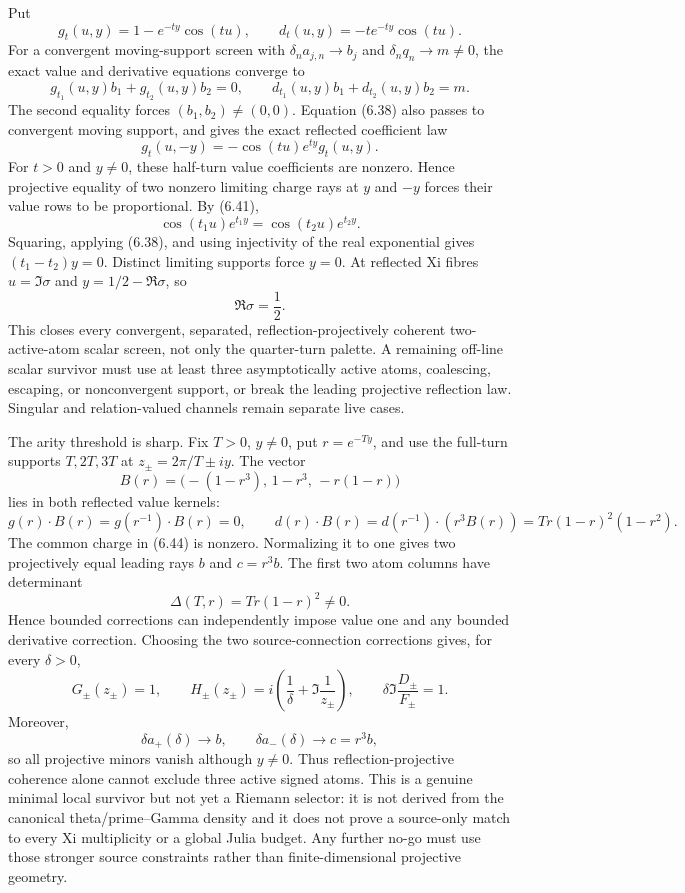 \documentclass[11pt]{article}
\theoremstyle{definition}
\theoremstyle{remark}
\begin{document}
Put
\[
 g_t(u,y)=1-e^{-ty}\cos(tu),\qquad
 d_t(u,y)=-te^{-ty}\cos(tu).                           \tag{6.39}
\]
For a convergent moving-support screen with $\delta_na_{j,n}\to b_j$ and
$\delta_nq_n\to m\ne0$, the exact value and derivative equations converge to
\[
 g_{t_1}(u,y)b_1+g_{t_2}(u,y)b_2=0,\qquad
 d_{t_1}(u,y)b_1+d_{t_2}(u,y)b_2=m.                   \tag{6.40}
\]
The second equality forces $(b_1,b_2)\ne(0,0)$.  Equation (6.38) also passes to convergent
moving support, and gives the exact reflected coefficient law
\[
 g_t(u,-y)=-\cos(tu)e^{ty}g_t(u,y).                   \tag{6.41}
\]
For $t>0$ and $y\ne0$, these half-turn value coefficients are nonzero.  Hence projective equality
of two nonzero limiting charge rays at $y$ and $-y$ forces their value rows to be proportional.
By (6.41),
\[
 \cos(t_1u)e^{t_1y}=\cos(t_2u)e^{t_2y}.
\]
Squaring, applying (6.38), and using injectivity of the real exponential gives
$(t_1-t_2)y=0$.  Distinct limiting supports force $y=0$.  At reflected Xi fibres
$u=\Im\sigma$ and $y=1/2-\Re\sigma$, so
\[
 \Re\sigma=\frac12.                                   \tag{6.42}
\]
This closes every convergent, separated, reflection-projectively coherent two-active-atom scalar
screen, not only the quarter-turn palette.  A remaining off-line scalar survivor must use at
least three asymptotically active atoms, coalescing, escaping, or nonconvergent support, or break
the leading projective reflection law.  Singular and relation-valued channels remain separate
live cases.

The arity threshold is sharp.  Fix $T>0$, $y\ne0$, put $r=e^{-Ty}$, and use the full-turn
supports $T,2T,3T$ at $z_\pm=2\pi/T\pm iy$.  The vector
\[
 B(r)=\bigl(-(1-r^3),\,1-r^3,\,-r(1-r)\bigr)           \tag{6.43}
\]
lies in both reflected value kernels:
\[
 g(r)\cdot B(r)=g(r^{-1})\cdot B(r)=0,
 \qquad
 d(r)\cdot B(r)=d(r^{-1})\cdot(r^3B(r))
 =Tr(1-r)^2(1-r^2).                                   \tag{6.44}
\]
The common charge in (6.44) is nonzero.  Normalizing it to one gives two projectively equal
leading rays $b$ and $c=r^3b$.  The first two atom columns have determinant
\[
 \Delta(T,r)=Tr(1-r)^2\ne0.                            \tag{6.45}
\]
Hence bounded corrections can independently impose value one and any bounded derivative
correction.  Choosing the two source-connection corrections gives, for every $\delta>0$,
\[
 G_\pm(z_\pm)=1,\qquad
 H_\pm(z_\pm)=i\left(\frac1\delta+\Im\frac1{z_\pm}\right),
 \qquad
 \delta\Im\frac{D_\pm}{F_\pm}=1.                       \tag{6.46}
\]
Moreover,
\[
 \delta a_+(\delta)\longrightarrow b,\qquad
 \delta a_-(\delta)\longrightarrow c=r^3b,             \tag{6.47}
\]
so all projective minors vanish although $y\ne0$.  Thus reflection-projective coherence alone
cannot exclude three active signed atoms.  This is a genuine minimal local survivor but not yet a
Riemann selector: it is not derived from the canonical theta/prime--Gamma density and it does not
prove a source-only match to every Xi multiplicity or a global Julia budget.  Any further no-go
must use those stronger source constraints rather than finite-dimensional projective geometry.
\end{document}
